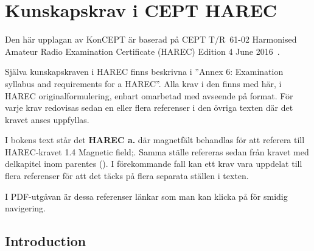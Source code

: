 \chapter{Kunskapskrav i CEPT HAREC}
\label{CEPT HAREC}

\noindent
Den här upplagan av KonCEPT är baserad på CEPT T/R~61-02 Harmonised Amateur
Radio Examination Certificate (HAREC) Edition 4 June 2016~\cite{TR6102}.

Själva kunskapskraven i HAREC finns beskrivna i
''Annex 6: Examination syllabus and requirements for a HAREC''.
Alla krav i den finns med här, i HAREC originalformulering, enbart omarbetad
med avseende på format.
För varje krav redovisas sedan en eller flera referenser i den övriga texten
där det kravet anses uppfyllas.

I bokens text står det \textbf{HAREC a.} där magnetfält
behandlas för att referera till HAREC-kravet 1.4 Magnetic field;.
Samma ställe refereras sedan från kravet med delkapitel inom parentes
().
I förekommande fall kan ett krav vara uppdelat till flera referenser för att
det täcks på flera separata ställen i texten.

I PDF-utgåvan är dessa referenser länkar som man kan klicka på för smidig
navigering.

\section{Introduction}

\makeatletter
\renewcommand{\theenumii}{\arabic{enumii}}
\renewcommand{\labelenumii}{\theenumi.\theenumii}
\renewcommand{\p@enumii}{\theenumi.}

\renewcommand{\theenumiii}{\arabic{enumiii}}
\renewcommand{\labelenumiii}{\theenumi.\theenumii.\theenumiii}
\renewcommand{\p@enumiii}{\theenumi.\theenumii.}
\makeatother

